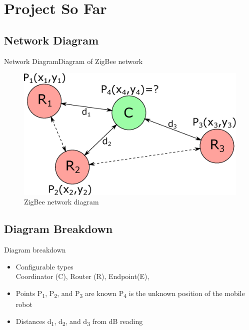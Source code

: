 \documentclass{beamer}
\begin{document}
  


\section{Project So Far}



\subsection{Network Diagram}
\begin{frame}{Network Diagram}{Diagram of ZigBee network}

\begin{figure}
    \centering
    \includegraphics[scale=.6]{figs/inkscape/XBeeConectionDiagram}
    \caption{ZigBee network diagram}
    \label{fig:subsysblock}
\end{figure}

\end{frame}


\subsection{Diagram Breakdown}
\begin{frame}{Diagram breakdown}
    \begin{itemize}
    \item
    Configurable types\\
    Coordinator (C), Router (R), Endpoint(E),
    \item
    Points P\textsubscript{1}, P\textsubscript{2}, and P\textsubscript{3} are known
    P\textsubscript{4} is the unknown position of the mobile robot
    \item
    Distances d\textsubscript{1}, d\textsubscript{2}, and d\textsubscript{3} from dB reading
    \end{itemize}
\end{frame}
\end{document}
